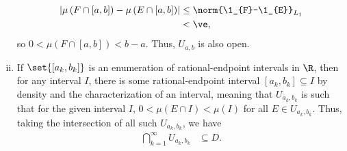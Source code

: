 \documentclass[10pt]{mypackage}
\begin{document}
\begin{enumerate}[(i)]
\begin{align*}
      \left\vert \mu\left( F\cap [a,b] \right) - \mu\left( E\cap [a,b] \right) \right\vert &\leq \norm{\1_{F}-\1_{E}}_{L_1}\\
                                                                                           &< \ve,
    \end{align*}
    so $0 < \mu\left( F\cap [a,b] \right) < b-a$. Thus, $U_{a,b}$ is also open.
  \item If $\set{\left[ a_k,b_k \right]}$ is an enumeration of rational-endpoint intervals in $\R$, then for any interval $I$, there is some rational-endpoint interval $\left[a_k,b_k\right]\subseteq I$ by density and the characterization of an interval, meaning that $U_{a_k,b_k}$ is such that for the given interval $I$, $0 < \mu\left( E\cap I \right) < \mu\left( I \right)$ for all $E\in U_{a_k,b_k}$. Thus, taking the intersection of all such $U_{a_k,b_k}$, we have
    \begin{align*}
      \bigcap_{k=1}^{\infty}U_{a_k,b_k} &\subseteq D.
    \end{align*}
    
\end{enumerate}
\end{document}
